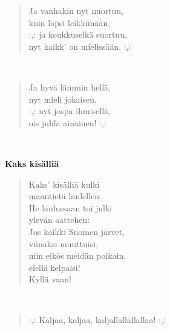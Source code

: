 \noindent\begin{minipage}{\linewidth}
\begin{verse}
	Ja vanhakin nyt nuortuu,\\
	kuin lapsi leikkimään,\\
	\hspace{0pt-\widthof{:,: }}:,: ja koukkuselkä suortuu,\\
	nyt kaikk' on mielissään. :,:\\
\end{verse}
\end{minipage}\\[10pt]
\noindent\begin{minipage}{\linewidth}
\begin{verse}
	Ja hyvä lämmin hellä,\\
	nyt mieli jokaisen,\\
	\hspace{0pt-\widthof{:,: }}:,: nyt jospa ihmisellä,\\
	ois juhla ainainen! :,:\\
\end{verse}
\end{minipage}\\[10pt]
%
%
\noindent\begin{minipage}{\linewidth}
\vspace{5pt}
\parbox[t]{0.85\linewidth}{\raggedright {\large\bf Kaks kisälliä}\\[6pt]}
\begin{verse}
	Kaks' kisälliä kulki\\
	maantietä laulellen.\\
	He laulussaan toi julki\\
	ylevän aattehen:\\
	Jos kaikki Suomen järvet,\\
	viinaksi muuttuisi,\\
	niin eikös meidän poikain,\\
	elellä kelpaisi!\\
	Kyllä vaan!\\
\end{verse}
\end{minipage}\\[10pt]
\noindent\begin{minipage}{\linewidth}
\begin{verse}
	\hspace{0pt-\widthof{:,: }}:,: Kaljaa, kaljaa, kaljallallallallaa! :,:\\
\end{verse}
\end{minipage}\\[10pt]
